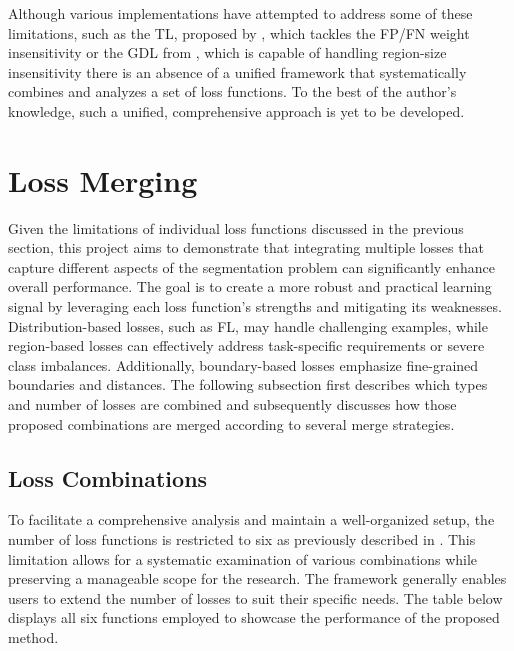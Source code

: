 Although various implementations have attempted to address some of these limitations, such as the \ac{TL}, proposed by \cite{DBLP:journals/corr/SalehiEG17a}, which tackles the FP/FN weight insensitivity or the \ac{GDL} from \cite{Sudre_2017}, which is capable of handling region-size insensitivity there is an absence of a unified framework that systematically combines and analyzes a set of loss functions. To the best of the author's knowledge, such a unified, comprehensive approach is yet to be developed.


\section{Loss Merging}
\label{sec:loss_merging}
Given the limitations of individual loss functions discussed in the previous section, this project aims to demonstrate that integrating multiple losses that capture different aspects of the segmentation problem can significantly enhance overall performance. The goal is to create a more robust and practical learning signal by leveraging each loss function's strengths and mitigating its weaknesses. Distribution-based losses, such as \acf{FL}, may handle challenging examples, while region-based losses can effectively address task-specific requirements or severe class imbalances. Additionally, boundary-based losses emphasize fine-grained boundaries and distances. The following subsection first describes which types and number of losses are combined and subsequently discusses how those proposed combinations are merged according to several merge strategies.
\subsection{Loss Combinations}
\label{subsec:loss_combinations}
To facilitate a comprehensive analysis and maintain a well-organized setup, the number of loss functions is restricted to six as previously described in . This limitation allows for a systematic examination of various combinations while preserving a manageable scope for the research. The framework generally enables users to extend the number of losses to suit their specific needs. The table below displays all six functions employed to showcase the performance of the proposed method.

